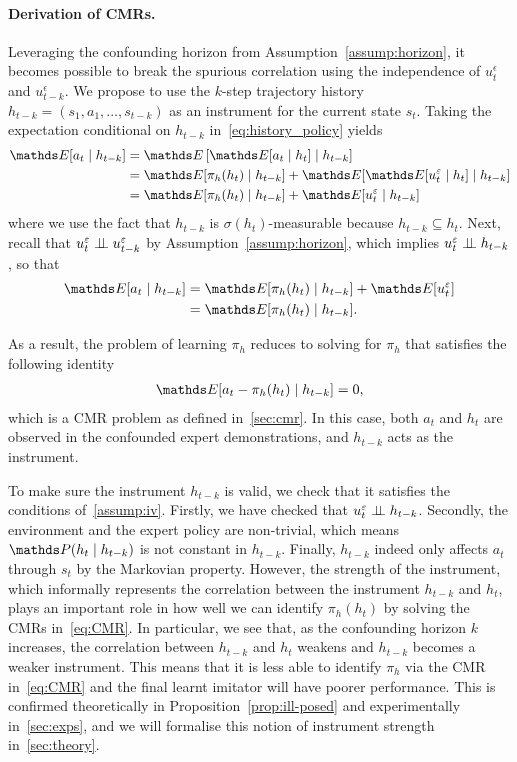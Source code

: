 \paragraph{Derivation of CMRs.} 
Leveraging the confounding horizon from Assumption~\ref{assump:horizon}, it becomes possible to break the spurious correlation using the independence of $u^\epsilon_t$ and $u^\epsilon_{t-k}$. We propose to use the $k$-step trajectory history $h_{t-k}=(s_{1},a_{1},...,s_{t-k})$ as an instrument for the current state $s_t$. Taking the expectation conditional on $h_{t-k}$ in~\cref{eq:history_policy} yields
\begin{align*}
    \expectE[a_t\mid h_{t-k}] & = \expectE\left[\expectE[a_t\mid h_{t}]\mid h_{t-k}\right] \\ & = \expectE[\pi_h(h_t)\mid h_{t-k}]+\expectE[\expectE[u^\epsilon_t\mid h_{t}]\mid h_{t-k}] \\
    & = \expectE[\pi_h(h_t) \mid h_{t-k}]+\expectE[u^\epsilon_t\mid h_{t-k}]
\end{align*}
where we use the fact that $h_{t-k}$ is $\sigma(h_t)$-measurable because $h_{t-k}\subseteq h_t$. Next, recall that $u^\varepsilon_t\perp \!\!\! \perp u^\varepsilon_{t-k}$ by Assumption~\ref{assump:horizon}, which implies $u^\varepsilon_t\perp \!\!\! \perp h_{t-k}$, so that %
\begin{align}
    \expectE[a_t\mid h_{t-k}] &= \expectE[\pi_h(h_t) \mid h_{t-k}]+\expectE[u^\epsilon_t]\nonumber\\
    &=\expectE[\pi_h(h_t) \mid h_{t-k}].
\end{align}

As a result, the problem of learning $\pi_h$ reduces to solving for $\pi_h$ that satisfies the following identity
\begin{align}
    \expectE[a_t-\pi_h(h_t)\mid h_{t-k}]=0,\label{eq:CMR}
\end{align}
which is a CMR problem as defined in~\cref{sec:cmr}. In this case, both $a_t$ and $h_t$ are observed in the confounded expert demonstrations, and $h_{t-k}$ acts as the instrument. 

To make sure the instrument $h_{t-k}$ is valid, we check that it satisfies the conditions of~\cref{assump:iv}. Firstly, we have checked that $u^\varepsilon_t\perp \!\!\! \perp h_{t-k}$. Secondly, the environment and the expert policy are non-trivial, which means $\probP(h_t\mid h_{t-k})$ is not constant in $h_{t-k}$. Finally, $h_{t-k}$ indeed only affects $a_t$ through $s_t$ by the Markovian property. However, the strength of the instrument, which informally represents the correlation between the instrument $h_{t-k}$ and $h_t$, plays an important role in how well we can identify $\pi_h(h_t)$ by solving the CMRs in~\cref{eq:CMR}. In particular, we see that, as the confounding horizon $k$ increases, the correlation between $h_{t-k}$ and $h_t$ weakens and $h_{t-k}$ becomes a weaker instrument. This means that it is less able to identify $\pi_h$ via the CMR in~\cref{eq:CMR} and the final learnt imitator will have poorer performance. This is confirmed theoretically in Proposition~\ref{prop:ill-posed} and experimentally in~\cref{sec:exps}, and we will formalise this notion of instrument strength in~\cref{sec:theory}.


